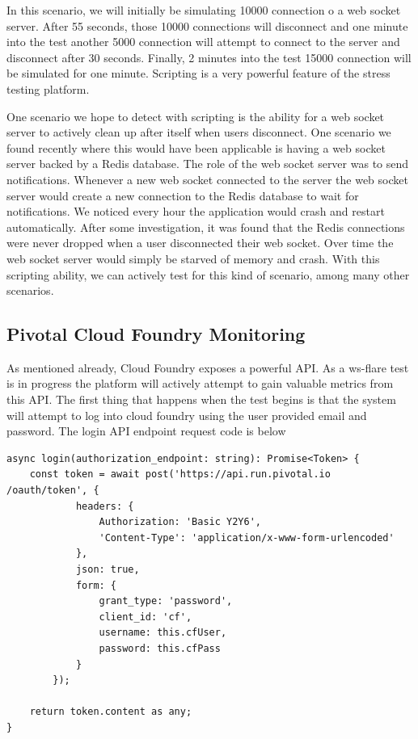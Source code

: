In this scenario, we will initially be simulating 10000 connection o a web socket server. After 55 seconds, those 10000 connections will disconnect and one minute into the test another 5000 connection will attempt to connect to the server and disconnect after 30 seconds. Finally, 2 minutes into the test 15000 connection will be simulated for one minute. Scripting is a very powerful feature of the stress testing platform. 

One scenario we hope to detect with scripting is the ability for a web socket server to actively clean up after itself when users disconnect. One scenario we found recently where this would have been applicable is having a web socket server backed by a Redis database. The role of the web socket server was to send notifications. Whenever a new web socket connected to the server the web socket server would create a new connection to the Redis database to wait for notifications. We noticed every hour the application would crash and restart automatically. After some investigation, it was found that the Redis connections were never dropped when a user disconnected their web socket. Over time the web socket server would simply be starved of memory and crash. With this scripting ability, we can actively test for this kind of scenario, among many other scenarios.

\subsection{Pivotal Cloud Foundry Monitoring}

As mentioned already, Cloud Foundry exposes a powerful API. As a ws-flare test is in progress the platform will actively attempt to gain valuable metrics from this API. The first thing that happens when the test begins is that the system will attempt to log into cloud foundry using the user provided email and password. The login API endpoint request code is below

\begin{verbatim}
async login(authorization_endpoint: string): Promise<Token> {
    const token = await post('https://api.run.pivotal.io
/oauth/token', {
            headers: {
                Authorization: 'Basic Y2Y6',
                'Content-Type': 'application/x-www-form-urlencoded'
            },
            json: true,
            form: {
                grant_type: 'password',
                client_id: 'cf',
                username: this.cfUser,
                password: this.cfPass
            }
        });

    return token.content as any;
}
\end{verbatim}


